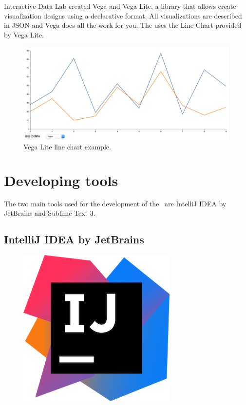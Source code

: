 Interactive Data Lab created Vega and Vega Lite, a library that allows create visualization designs using a declarative format. All visualizations are described in JSON\cite{json} and Vega does all the work for you. The  uses the Line Chart provided by Vega Lite.

\begin{figure}[H]
\centering
\includegraphics[scale=0.4]{resources/lineal-chart-example01.png}
\caption{Vega Lite line chart example.}
\end{figure}

\section{Developing tools}

The two main tools used for the development of the \thesis\ are IntelliJ IDEA by JetBrains and Sublime Text 3.

\subsection*{IntelliJ IDEA by JetBrains\cite{intellij}}

\begin{figure}[H]
\includegraphics[scale=0.1]{resources/intellij-logo.png}
\end{figure}

